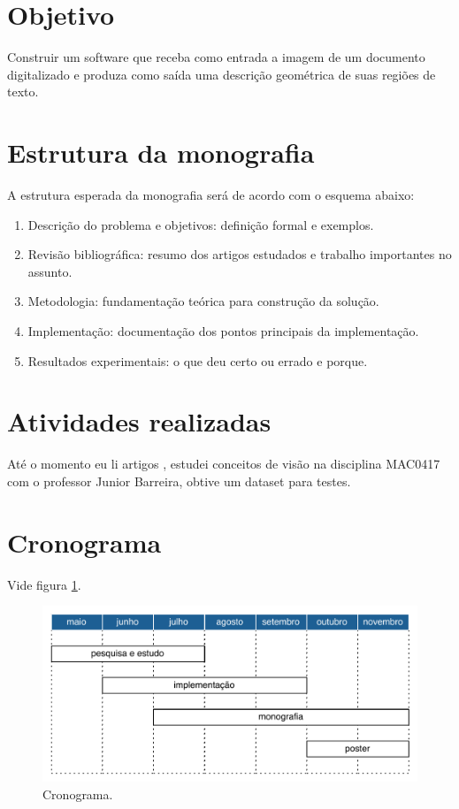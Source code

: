 \documentclass[a4paper,11pt]{article}
\begin{document}
\section{Objetivo}

Construir um software que receba como entrada a imagem de um documento digitalizado e produza como saída uma descrição geométrica \cite{10.1109/ICDAR.2007.207} de suas regiões de texto.

\section{Estrutura da monografia}

A estrutura esperada da monografia será de acordo com o esquema abaixo:

\begin{enumerate}
	\item Descrição do problema e objetivos: definição formal e exemplos.
	\item Revisão bibliográfica: resumo dos artigos estudados e trabalho importantes no assunto.
	\item Metodologia: fundamentação teórica para construção da solução.
	\item Implementação: documentação dos pontos principais da implementação.
	\item Resultados experimentais: o que deu certo ou errado e porque.
\end{enumerate}


\section{Atividades realizadas}

Até o momento eu li artigos \cite{10.1109/ICDAR.2007.207} \cite{Antonacopoulos95representationand} \cite{Antonacopoulos09arealistic} \cite{Moll07documentcontent}
\cite{Smith:2009:HPL:1634930.1635410} \cite{DBLP:conf/icdar/2009} \cite{DBLP:conf/icdar/AntonacopoulosPBP09}, estudei conceitos de visão na disciplina MAC0417 com o professor Junior Barreira, obtive um dataset para testes.

\section{Cronograma}

Vide figura \ref{fig:schedule1}.

\begin{figure}[htb!]
\begin{center}
\includegraphics{assets/schedule.pdf}
\end{center}
\caption{Cronograma.}
\label{fig:schedule1}
\end{figure}

\end{document}
